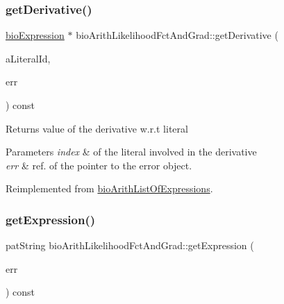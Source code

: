 \mbox{\label{classbio_arith_likelihood_fct_and_grad_ab814e1cc11e481c88ba1d7401432c706}} 
\subsubsection{\texorpdfstring{get\+Derivative()}{getDerivative()}}
{\footnotesize\ttfamily \hyperlink{classbio_expression}{bio\+Expression} $\ast$ bio\+Arith\+Likelihood\+Fct\+And\+Grad\+::get\+Derivative (\begin{DoxyParamCaption}\item[{pat\+U\+Long}]{a\+Literal\+Id,  }\item[{pat\+Error $\ast$\&}]{err }\end{DoxyParamCaption}) const\hspace{0.3cm}{\ttfamily [virtual]}}

\begin{DoxyReturn}{Returns}
value of the derivative w.\+r.\+t literal 
\end{DoxyReturn}

\begin{DoxyParams}{Parameters}
{\em index} & of the literal involved in the derivative \\
\hline
{\em err} & ref. of the pointer to the error object. \\
\hline
\end{DoxyParams}


Reimplemented from \hyperlink{classbio_arith_list_of_expressions_a14fe977b86bc69c4b3afe59d44b6c03f}{bio\+Arith\+List\+Of\+Expressions}.

\mbox{\label{classbio_arith_likelihood_fct_and_grad_ae264b073115dcff703cf2b7926384976}} 
\subsubsection{\texorpdfstring{get\+Expression()}{getExpression()}}
{\footnotesize\ttfamily pat\+String bio\+Arith\+Likelihood\+Fct\+And\+Grad\+::get\+Expression (\begin{DoxyParamCaption}\item[{pat\+Error $\ast$\&}]{err }\end{DoxyParamCaption}) const\hspace{0.3cm}{\ttfamily [virtual]}}

